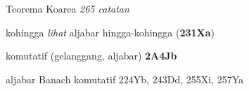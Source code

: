  Teorema Koarea {\it 265 catatan}





























































 kohingga {\it lihat} aljabar hingga-kohingga ({\bf 231Xa})






















 komutatif (gelanggang, aljabar) {\bf 2A4Jb}


aljabar Banach komutatif 224Yb, 243Dd, 255Xi, 257Ya
























